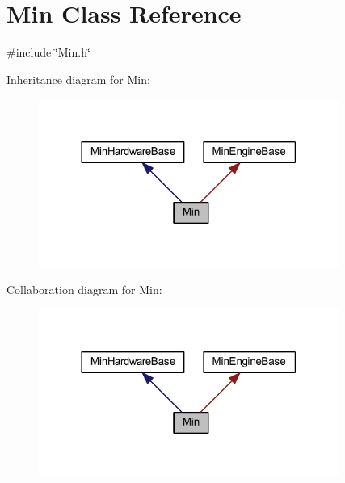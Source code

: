 \hypertarget{class_min}{}\section{Min Class Reference}
\label{class_min}


{\ttfamily \#include \char`\"{}Min.\+h\char`\"{}}



Inheritance diagram for Min\+:
\nopagebreak
\begin{figure}[H]
\begin{center}
\leavevmode
\includegraphics[width=278pt]{class_min__inherit__graph}
\end{center}
\end{figure}


Collaboration diagram for Min\+:
\nopagebreak
\begin{figure}[H]
\begin{center}
\leavevmode
\includegraphics[width=278pt]{class_min__coll__graph}
\end{center}
\end{figure}
